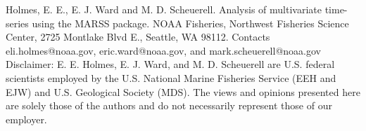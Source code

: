 

\thispagestyle{empty}
\vspace*{14cm}
\vfil
\begin{flushleft}

Holmes, E. E., E. J. Ward and M. D. Scheuerell. Analysis of multivariate time-series using the MARSS package. NOAA Fisheries, Northwest Fisheries Science Center, 2725 Montlake Blvd E., Seattle, WA 98112.  Contacts eli.holmes@noaa.gov, eric.ward@noaa.gov, and mark.scheuerell@noaa.gov
\newline
\newline
Disclaimer: E. E. Holmes, E. J. Ward, and M. D. Scheuerell are U.S. federal scientists employed by the U.S. National Marine Fisheries Service (EEH and EJW) and U.S. Geological Society (MDS).  The views and opinions presented here are solely those of the authors and do not necessarily represent those of our employer.

\end{flushleft}

